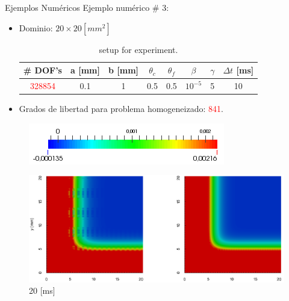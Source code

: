 \documentclass[11pt,spanish]{beamer}
\newcommand{\red}{\textcolor{red}}
\begin{document}
\begin{frame}{Ejemplos Numéricos}
Ejemplo numérico \# 3:

\begin{itemize}
\item Dominio: $20 \times 20 [mm^2]$
\begin{table}[H]
\centering
\begin{tabular}{@{}cccccccc@{}}
\toprule
 \# DOF's & a {[}mm{]} & b {[}mm{]} & $\theta_c$ & $\theta_f$ & $\beta$   & $\gamma$ & $\Delta t$ [ms]\\ \midrule
 \red{328854}   & 0.1        & 1          & 0.5        & 0.5        & $10^{-5}$     & 5   & 10     \\ \bottomrule
\end{tabular}
\caption{setup for experiment.} 
\end{table}
\item Grados de libertad para problema homogeneizado: \red{841}.
\end{itemize}
\end{frame}


\begin{frame}
\begin{figure}[H]
\centering
\includegraphics[height = 0.9 cm]{fig/numerical_example_MDE_exp3_colourbar}
\end{figure}
\begin{figure}[H]
\centering
\includegraphics[height = 5 cm]{fig/numerical_example_MDE_exp3_20ms}
\caption{20 [ms]}
\end{figure}
\end{frame}
\end{document}
